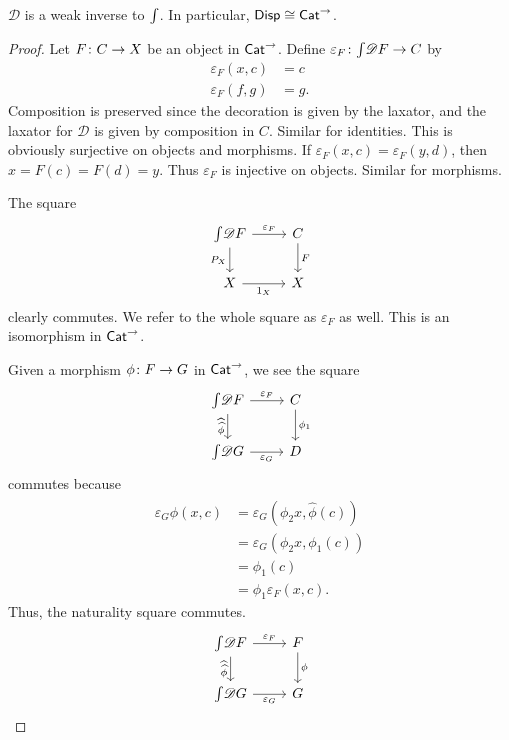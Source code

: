 \begin{thm}
\label{thm:dispequivcatarrow}
    $\mathscr D$ is a weak inverse to $\textstyle{\int}$. In particular, $\mathsf{Disp} \cong \mathsf{Cat}^\to$.
\end{thm}
\begin{proof}
    Let $F \colon C \to X$ be an object in $\mathsf{Cat}^\to$. Define $\varepsilon_F \colon \textstyle{\int} \mathscr DF \to C$ by 
    \begin{align*}
        \varepsilon_F(x,c) &= c\\
        \varepsilon_F(f,g) &= g.
    \end{align*}
    Composition is preserved since the decoration is given by the laxator, and the laxator for $\mathscr D$ is given by composition in $C$. Similar for identities. This is obviously surjective on objects and morphisms. If $\varepsilon_F(x,c) = \varepsilon_F(y,d)$, then $x = F(c) = F(d) = y$. Thus $\varepsilon_F$ is injective on objects. Similar for morphisms.
    
    The square
    \[
    \begin{tikzcd}
        \Int \mathscr DF
        \arrow[d, swap, "P_X"]
        \arrow[r, "\varepsilon_F"]
        &
        C
        \arrow[d, "F"]
        \\
        X
        \arrow[r, swap, "1_X"]
        &
        X
    \end{tikzcd}
    \]
    clearly commutes. We refer to the whole square as $\varepsilon_F$ as well. This is an isomorphism in $\mathsf{Cat}^\to$.
    
    Given a morphism $\phi \colon F \to G$ in $\mathsf{Cat}^\to$, we see the square
    \[
    \begin{tikzcd}
        \Int \mathscr DF
        \arrow[r, "\varepsilon_F"]
        \arrow[d, swap, "\widehat{\widehat{\phi}}"]
        &
        C
        \arrow[d, "\phi_1"]
        \\
        \Int \mathscr DG
        \arrow[r, swap, "\varepsilon_G"]
        &
        D
    \end{tikzcd}
    \]
    commutes because 
    \begin{align*}
        \varepsilon_G \widehat{\widehat{\phi}}(x,c)
        &= \varepsilon_G (\phi_2 x, \widehat \phi (c))
        \\&= \varepsilon_G (\phi_2 x, \phi_1 (c))
        \\&= \phi_1(c)
        \\&= \phi_1 \varepsilon_F (x, c).
     \end{align*}
    Thus, the naturality square commutes.
    \[
    \begin{tikzcd}
        \Int \mathscr DF
        \arrow[r, "\varepsilon_F"]
        \arrow[d, swap, "\widehat{\widehat{\phi}}"]
        &
        F
        \arrow[d, "\phi"]
        \\
        \Int \mathscr DG
        \arrow[r, swap, "\varepsilon_G"]
        &
        G
    \end{tikzcd}
    \]
    

\end{proof}
